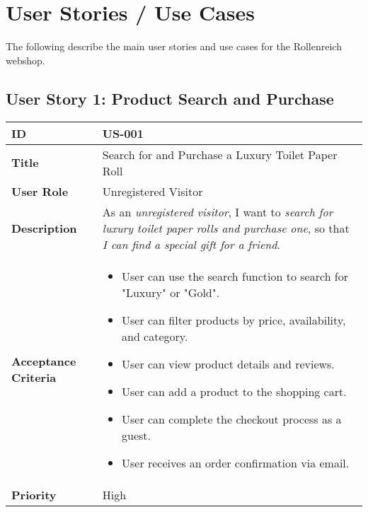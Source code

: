 \documentclass[a4paper,11pt]{article}
\begin{document}
\section{User Stories / Use Cases}
The following describe the main user stories and use cases for the Rollenreich webshop.

\subsection{User Story 1: Product Search and Purchase}
\begin{tabularx}{\textwidth}{|l|X|}
\hline
\textbf{ID} & US-001 \\
\hline
\textbf{Title} & Search for and Purchase a Luxury Toilet Paper Roll \\
\hline
\textbf{User Role} & Unregistered Visitor \\
\hline
\textbf{Description} & As an \textit{unregistered visitor}, I want to \textit{search for luxury toilet paper rolls and purchase one}, so that \textit{I can find a special gift for a friend}. \\
\hline
\textbf{Acceptance Criteria} &
\begin{itemize}[noitemsep, topsep=0pt]
    \item User can use the search function to search for "Luxury" or "Gold".
    \item User can filter products by price, availability, and category.
    \item User can view product details and reviews.
    \item User can add a product to the shopping cart.
    \item User can complete the checkout process as a guest.
    \item User receives an order confirmation via email.
\end{itemize} \\
\hline
\textbf{Priority} & High \\
\hline
\end{tabularx}
\end{document}
